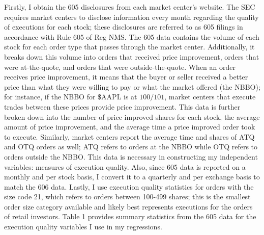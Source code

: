 \documentclass[12pt,a4paper]{article}
\begin{document}
	
		Firstly, I obtain the 605 disclosures from each market center's website. The SEC requires market centers to disclose information every month regarding the quality of executions for each stock; these disclosures are referred to as 605 filings in accordance with Rule 605 of Reg NMS. The 605 data contains the volume of each stock for each order type that passes through the market center. Additionally, it breaks down this volume into orders that received price improvement, orders that were at-the-quote, and orders that were outside-the-quote. When an order receives price improvement, it means that the buyer or seller received a better price than what they were willing to pay or what the market offered (the NBBO); for instance, if the NBBO for \$AAPL is at $100/101$, market centers that execute trades between these prices provide price improvement. This data is further broken down into the number of price improved shares for each stock, the average amount of price improvement, and the average time a price improved order took to execute. Similarly, market centers report the average time and shares of ATQ and OTQ orders as well; ATQ refers to orders at the NBBO while OTQ refers to orders outside the NBBO. This data is necessary in constructing my independent variables: measures of execution quality. Also, since 605 data is reported on a monthly and per stock basis, I convert it to a quarterly and per exchange basis to match the 606 data. Lastly, I use execution quality statistics for orders with the size code 21, which refers to orders between 100-499 shares; this is the smallest order size category available and likely best represents executions for the orders of retail investors. Table 1 provides summary statistics from the 605 data for the execution quality variables I use in my regressions.
		
\end{document}
